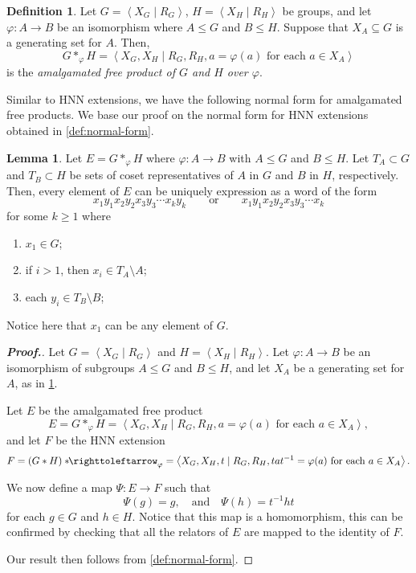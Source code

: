 \documentclass[11pt,a4paper,reqno]{amsart}
\theoremstyle{plain}
\theoremstyle{definition}
\newtheorem{lemma}[theorem]{Lemma}
\newtheorem{definition}[theorem]{Definition}
\theoremstyle{definition}
\renewcommand\leq\leqslant
\renewcommand\geq\geqslant
\newenvironment{myproof}{\begin{proof}[\normalfont\bfseries Proof.]}{\end{proof}}
\newcommand\hnn{*\!\!\righttoleftarrow}
\begin{document}
\begin{definition}\label{def:amalgamated}
	Let $G = \left\langle X_G\mid R_G \right\rangle$, $H = \left\langle X_H \mid R_H\right\rangle$ be groups,
	and let $\varphi\colon A\to B$ be an isomorphism where $A\leq G$ and $B\leq H$.
	Suppose that $X_A\subseteq G$ is a generating set for $A$.
	Then,
	\[
		G*_\varphi H
		=
		\left\langle X_G, X_H
		\mid
		R_G, R_H, a = \varphi(a)\text{ for each }a\in X_A
		\right\rangle
	\]
	is the \emph{amalgamated free product of $G$ and $H$ over $\varphi$}.
\end{definition}

Similar to HNN extensions, we have the following normal form for amalgamated free products.
We base our proof on the normal form for HNN extensions obtained in \cref{def:normal-form}.

\begin{lemma}\label{lem:amalgamated-normal-form}
	Let $E = G *_\varphi H$ where $\varphi\colon A\to B$ with $A\leq G$ and $B \leq H$.
	Let $T_A\subset G$ and $T_B \subset H$ be sets of coset representatives of $A$ in $G$ and $B$ in $H$, respectively.
	Then, every element of $E$ can be uniquely expression as a word of the form
	\[
		x_1 y_1 x_2 y_2 x_3 y_3 \cdots x_k y_k
		\qquad\text{or}\qquad
		x_1 y_1 x_2 y_2 x_3 y_3 \cdots x_k
	\]
	for some $k \geq 1$ where
	\begin{enumerate}
		\item $x_1 \in G$;
		\item if $i > 1$, then $x_i \in T_A\setminus A$;
		\item each $y_i \in T_B\setminus B$;
	\end{enumerate}
	Notice here that $x_1$ can be any element of $G$.
\end{lemma}

\begin{myproof}
	Let $G = \left\langle X_G \mid R_G\right\rangle$ and $H = \left\langle X_H \mid R_H\right\rangle$.
	Let $\varphi\colon A\to B$ be an isomorphism of subgroups $A\leq G$ and $B\leq H$, and let $X_A$ be a generating set for $A$, as in \cref{def:amalgamated}.

	Let $E$ be the amalgamated free product
	\[
		E = G*_\varphi H
		=
		\left\langle X_G, X_H
		\mid
		R_G, R_H, a = \varphi(a)\text{ for each }a\in X_A
		\right\rangle,
	\]
	and let $F$ be the HNN extension
	\[
		F
		=
		(G * H)\hnn_{\varphi}
		=
		\left\langle
		X_G, X_H,t
		\mid
    R_G, R_H,
		t a t^{-1} = \varphi(a) \text{ for each }a\in X_A
		\right\rangle.
	\]

	We now define a map $\Psi\colon E\to F$ such that
	\[
		\Psi(g) = g ,\quad
		\text{and}\quad
		\Psi(h) = t^{-1}ht
	\]
	for each $g\in G$ and $h\in H$.
	Notice that this map is a homomorphism, this can be confirmed by checking that all the relators of $E$ are mapped to the identity of $F$.

	Our result then follows from \cref{def:normal-form}.
\end{myproof}
\end{document}
